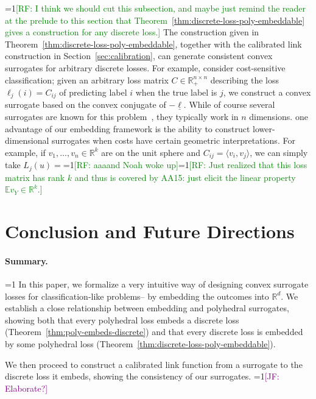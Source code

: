 \documentclass[12pt]{article}
\newcommand{\Comments}{1}
\newcommand{\mynote}[2]{\ifnum\Comments=1\textcolor{#1}{#2}\fi}
\newcommand{\mytodo}[2]{\ifnum\Comments=1%
  \todo[linecolor=#1!80!black,backgroundcolor=#1,bordercolor=#1!80!black]{#2}\fi}
\newcommand{\raf}[1]{\mynote{green}{[RF: #1]}}
\newcommand{\jessie}[1]{\mynote{purple}{[JF: #1]}}
\newcommand{\jessiet}[1]{\mytodo{purple!20!white}{JF: #1}}
\newcommand{\reals}{\mathbb{R}}
\newcommand{\E}{\mathbb{E}}
\newcommand{\risk}[1]{\underline{#1}}
\newcommand{\inprod}[2]{\langle #1, #2 \rangle}%
\begin{document}
\raf{I think we should cut this subsection, and maybe just remind the reader at the prelude to this section that Theorem~\ref{thm:discrete-loss-poly-embeddable} gives a construction for any discrete loss.}
The construction given in Theorem~\ref{thm:discrete-loss-poly-embeddable}, together with the calibrated link construction in Section~\ref{sec:calibration}, can generate consistent convex surrogates for arbitrary discrete losses.
For example, consider cost-sensitive classification; given an arbitrary loss matrix $C \in \reals^{n\times n}_+$ describing the loss $\ell_j(i) = C_{ij}$ of predicting label $i$ when the true label is $j$, we construct a convex surrogate based on the convex conjugate of $-\risk{\ell}$.
While of course several surrogates are known for this problem~\cite{pires2013cost}, they typically work in $n$ dimensions.
one advantage of our embedding framework is the ability to construct lower-dimensional surrogates when costs have certain geometric interpretations.
For example, if $v_1,\ldots,v_n \in \reals^k$ are on the unit sphere and $C_{ij} = \inprod{v_i}{v_j}$, we can simply take $L_j(u) = $\raf{aaaand Noah woke up}\raf{Just realized that this loss matrix has rank $k$ and thus is covered by AA15: just elicit the linear property $\E v_Y \in \reals^k$.}

\section{Conclusion and Future Directions} \label{sec:conclusion}
\paragraph{Summary.}
\jessiet{Old conclusion commented out.}
In this paper, we formalize a very intuitive way of designing convex surrogate losses for classification-like problems-- by embedding the outcomes into $\reals^d$.
We establish a close relationship between embedding and polyhedral surrogates, showing both that every polyhedral loss embeds a discrete loss (Theorem~\ref{thm:poly-embeds-discrete}) and that every discrete loss is embedded by some polyhedral loss (Theorem~\ref{thm:discrete-loss-poly-embeddable}).

We then proceed to construct a calibrated link function from a surrogate to the discrete loss it embeds, showing the consistency of our surrogates.
\jessie{Elaborate?}
\end{document}
